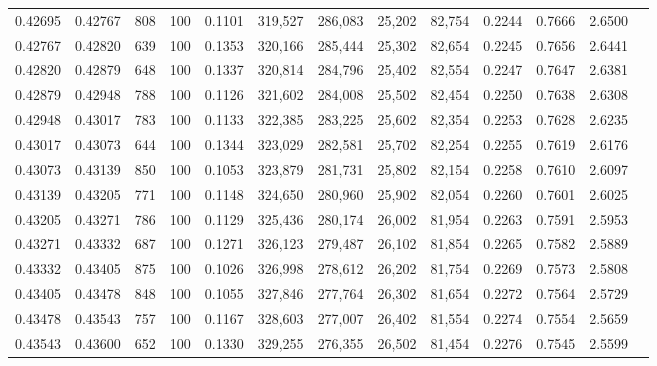 \begin{tabular}{rrrrrrrrrrrrr}
0.42695 & 0.42767 &   808 & 100 &                                     0.1101 & 319,527 & 286,083 &  25,202 &  82,754 & 0.2244 & 0.7666 & 2.6500 \\
0.42767 & 0.42820 &   639 & 100 &                                     0.1353 & 320,166 & 285,444 &  25,302 &  82,654 & 0.2245 & 0.7656 & 2.6441 \\
0.42820 & 0.42879 &   648 & 100 &                                     0.1337 & 320,814 & 284,796 &  25,402 &  82,554 & 0.2247 & 0.7647 & 2.6381 \\
0.42879 & 0.42948 &   788 & 100 &                                     0.1126 & 321,602 & 284,008 &  25,502 &  82,454 & 0.2250 & 0.7638 & 2.6308 \\
0.42948 & 0.43017 &   783 & 100 &                                     0.1133 & 322,385 & 283,225 &  25,602 &  82,354 & 0.2253 & 0.7628 & 2.6235 \\
0.43017 & 0.43073 &   644 & 100 &                                     0.1344 & 323,029 & 282,581 &  25,702 &  82,254 & 0.2255 & 0.7619 & 2.6176 \\
0.43073 & 0.43139 &   850 & 100 &                                     0.1053 & 323,879 & 281,731 &  25,802 &  82,154 & 0.2258 & 0.7610 & 2.6097 \\
0.43139 & 0.43205 &   771 & 100 &                                     0.1148 & 324,650 & 280,960 &  25,902 &  82,054 & 0.2260 & 0.7601 & 2.6025 \\
0.43205 & 0.43271 &   786 & 100 &                                     0.1129 & 325,436 & 280,174 &  26,002 &  81,954 & 0.2263 & 0.7591 & 2.5953 \\
0.43271 & 0.43332 &   687 & 100 &                                     0.1271 & 326,123 & 279,487 &  26,102 &  81,854 & 0.2265 & 0.7582 & 2.5889 \\
0.43332 & 0.43405 &   875 & 100 &                                     0.1026 & 326,998 & 278,612 &  26,202 &  81,754 & 0.2269 & 0.7573 & 2.5808 \\
0.43405 & 0.43478 &   848 & 100 &                                     0.1055 & 327,846 & 277,764 &  26,302 &  81,654 & 0.2272 & 0.7564 & 2.5729 \\
0.43478 & 0.43543 &   757 & 100 &                                     0.1167 & 328,603 & 277,007 &  26,402 &  81,554 & 0.2274 & 0.7554 & 2.5659 \\
0.43543 & 0.43600 &   652 & 100 &                                     0.1330 & 329,255 & 276,355 &  26,502 &  81,454 & 0.2276 & 0.7545 & 2.5599 \\

\end{tabular}
